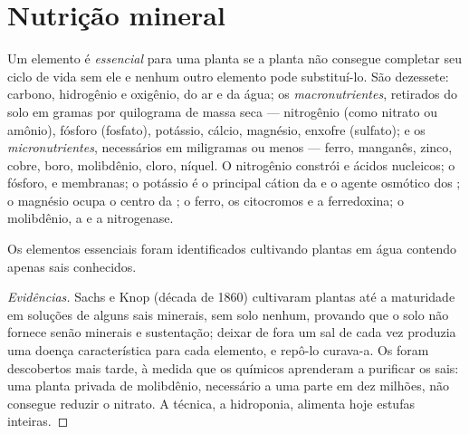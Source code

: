 \section{Nutrição mineral}

\begin{definition}\label{def:b1:plant-water-minerals:elements}
Um elemento é \emph{essencial} para uma planta se a planta não
consegue completar seu ciclo de vida sem ele e nenhum outro elemento
pode substituí-lo. São dezessete: carbono, hidrogênio e oxigênio, do
ar e da água; os \emph{macronutrientes}, retirados do solo em gramas
por quilograma de massa seca --- nitrogênio (como nitrato ou amônio),
fósforo (fosfato), potássio, cálcio, magnésio, enxofre (sulfato); e os
\emph{micronutrientes}, necessários em miligramas ou menos --- ferro,
manganês, zinco, cobre, boro, molibdênio, cloro, níquel. O nitrogênio
constrói  e ácidos nucleicos; o fósforo,  e
membranas; o potássio é o principal cátion da  e o agente
osmótico dos ; o magnésio ocupa o centro da ; o
ferro, os citocromos e a ferredoxina; o molibdênio, a 
e a nitrogenase.
\end{definition}

\begin{proposition}\label{prop:b1:plant-water-minerals:hydroponics}
Os elementos essenciais foram identificados cultivando plantas em água
contendo apenas sais conhecidos.
\end{proposition}
\begin{proof}[Evidências]
Sachs e Knop (década de 1860) cultivaram plantas até a maturidade em
soluções de alguns sais minerais, sem solo nenhum, provando que o solo
não fornece senão minerais e sustentação; deixar de fora um sal de
cada vez produzia uma doença característica para cada elemento, e
repô-lo curava-a. Os  foram descobertos mais tarde, à
medida que os químicos aprenderam a purificar os sais: uma planta
privada de molibdênio, necessário a uma parte em dez milhões, não
consegue reduzir o nitrato. A técnica, a hidroponia, alimenta hoje
estufas inteiras.
\end{proof}

